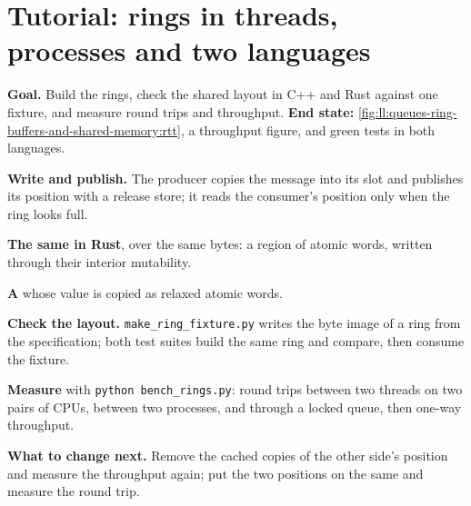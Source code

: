 \section{Tutorial: rings in threads, processes and two languages}\label{tut:ll:queues-ring-buffers-and-shared-memory:tut}

\begin{tutorial}
\textbf{Goal.} Build the rings, check the shared layout in C++ and Rust against one fixture, and measure round trips and
throughput. \textbf{End state:} \cref{fig:ll:queues-ring-buffers-and-shared-memory:rtt}, a throughput figure, and green tests in
both languages.
\begin{tutsteps}
\item \textbf{Write and publish.} The producer copies the message into its slot and publishes its position with a release store;
it reads the consumer's position only when the ring looks full.
\label{lst:ll:queues-ring-buffers-and-shared-memory:spsc}
\item \textbf{The same in Rust}, over the same bytes: a region of atomic words, written through their interior mutability.
\label{lst:ll:queues-ring-buffers-and-shared-memory:rust}
\item \textbf{A } whose value is copied as relaxed atomic words.
\label{lst:ll:queues-ring-buffers-and-shared-memory:seqlock}
\item \textbf{Check the layout.} \texttt{make\_ring\_fixture.py} writes the byte image of a ring from the specification; both
test suites build the same ring and compare, then consume the fixture.
\item \textbf{Measure} with \texttt{python bench\_rings.py}: round trips between two threads on two pairs of CPUs, between two
processes, and through a locked queue, then one-way throughput.
\end{tutsteps}
\textbf{What to change next.} Remove the cached copies of the other side's position and measure the throughput again; put the two
positions on the same  and measure the round trip.
\end{tutorial}

